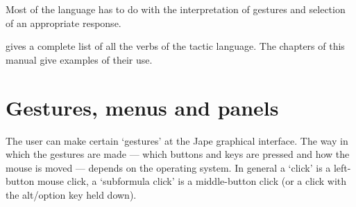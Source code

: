 Most of the language has to do with the interpretation of gestures and selection of an appropriate response.

 gives a complete list of all the verbs of the tactic language. The chapters of this manual give examples of their use.

\section{Gestures, menus and panels}
\label{sec:basics:gestures}

The user can make certain `gestures' at the Jape graphical interface. The way in which the gestures are made --- which buttons and keys are pressed and how the mouse is moved --- depends on the operating system. In general a `click' is a left-button mouse click, a `subformula click' is a middle-button click (or a click with the alt/option key held down).
